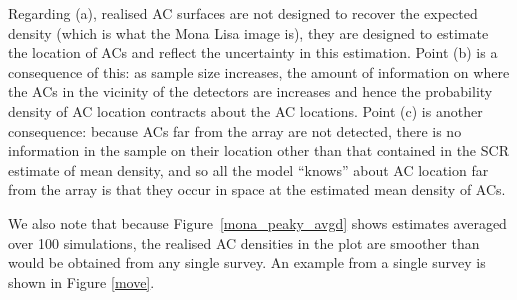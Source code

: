 \documentclass[10pt,a4paper]{article}
\begin{document}
Regarding (a), realised AC surfaces are not designed to recover the expected density (which is what the Mona Lisa image is), they are designed to estimate the location of ACs and reflect the uncertainty in this estimation. Point (b) is a consequence of this: as sample size increases, the amount of information on where the ACs in the vicinity of the detectors are increases and hence the probability density of AC location contracts about the AC locations. Point (c) is another consequence: because ACs far from the array are not detected, there is no information in the sample on their location other than that contained in the SCR estimate of mean density, and so all the model ``knows'' about AC location far from the array is that they occur in space at the estimated mean density of ACs. 

We also note that because Figure~\ref{mona_peaky_avgd} shows estimates averaged over 100 simulations, the realised AC densities in the plot are smoother than would be obtained from any single survey. An example from a single survey is shown in Figure \ref{move}.


\end{document}
